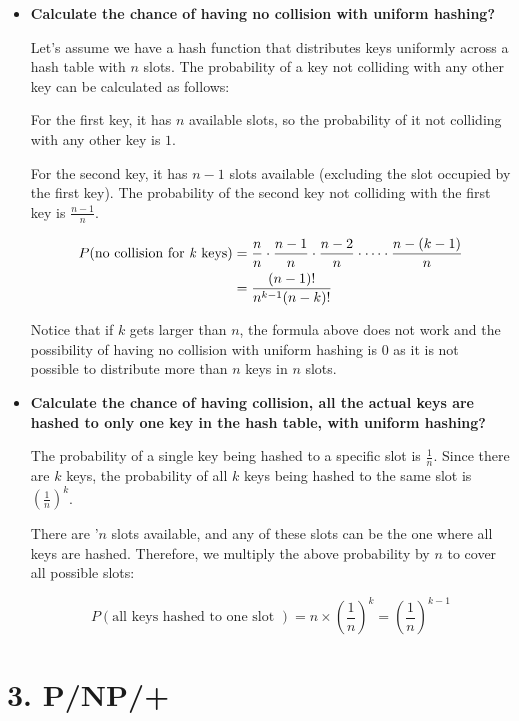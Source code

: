 \documentclass[10pt]{article}
\begin{document}
\begin{itemize}
  \item {
        \textbf{Calculate the chance of having no collision with uniform hashing?}

        Let's assume we have a hash function that distributes keys uniformly across a hash table with $n$ slots. The probability of a key not colliding with any other key can be calculated as follows:

        For the first key, it has $n$ available slots, so the probability of it not colliding with any other key is $1$.

        For the second key, it has $n-1$ slots available (excluding the slot occupied by the first key). The probability of the second key not colliding with the first key is $\frac{n-1}{n}$.

        \begin{align*}P(\text{no collision for \textit{k} keys})
           & = \frac{n}{n} \cdot \frac{n-1}{n} \cdot \frac{n-2}{n} \cdot \cdots \cdot \frac{n-(k-1)}{n} \\
           & =  \frac{(n-1)!}{n^{k-1}(n-k)!}
        \end{align*}

        Notice that if $k$ gets larger than $n$, the formula above does not work and the possibility of having no collision with uniform hashing is $0$ as it is not possible to distribute more than $n$ keys in $n$ slots.
        }
  \item {
        \textbf{Calculate the chance of having collision, all the actual keys are hashed to only one key in the hash table, with uniform hashing?}

        The probability of a single key being hashed to a specific slot is $\frac{1}{n}$. Since there are $k$ keys, the probability of all $k$ keys being hashed to the same slot is $(\frac{1}{n})^k$.

        There are '$n$ slots available, and any of these slots can be the one where all keys are hashed. Therefore, we multiply the above probability by $n$ to cover all possible slots:


        \[P(\text{all keys hashed to one slot }) = n \times (\frac{1}{n})^k = (\frac{1}{n})^{k-1} \]
        }
\end{itemize}

\section*{3. P/NP/+}
\end{document}
